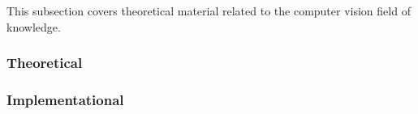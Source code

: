 \documentclass[../../../main]{subfiles}
\begin{document}
This subsection covers theoretical material related to the computer vision field of knowledge.

\subsubsection{Theoretical}

\newpage

\subsubsection{Implementational}

\newpage
\end{document}
